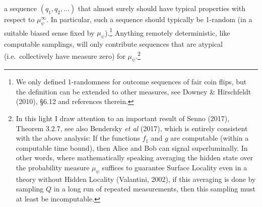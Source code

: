 \documentclass[11pt,a4paper]{article}
\numberwithin{equation}{section}
\begin{document}
a sequence $(q_1, q_2, \ldots)$ that almost surely should have typical properties with respect to $\mu^{\infty}_{\psi}$.
In particular, such a sequence should typically be 1-random (in a suitable biased sense fixed by  $\mu_{\psi}$).\footnote{\label{noloss} We only defined 1-randomness for outcome sequences of fair coin flips, but  the definition can be extended to other measures, see Downey \& Hirschfeldt (2010), \S 6.12 and references therein.}   Anything remotely deterministic, like computable samplings, will only contribute  sequences that are atypical (i.e.\ collectively have measure zero) for $\mu_{\psi}$.\footnote{\label{31}
In this light I  draw attention to an important result of Senno (2017), Theorem 3.2.7, see also  Bendersky \emph{et al} (2017), which is entirely consistent with the above analysis: If  the functions $f_1$ and $g$  are computable (within a computable time bound), then Alice and Bob can signal superluminally.
In other words, where mathematically speaking averaging the hidden state over the probability measure  $\mu_{\psi}$ suffices to guarantee Surface Locality even in a theory without Hidden Locality (Valantini, 2002), if this averaging is done by sampling $Q$ in a long run of repeated measurements, then this sampling must at least be incomputable.} 
\end{document}
